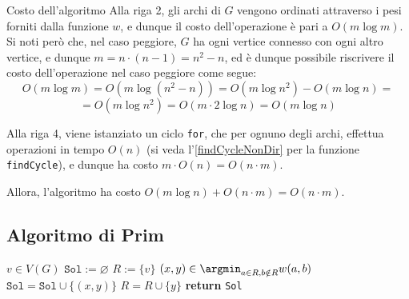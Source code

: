 \documentclass[a4paper, 12pt]{report}
\begin{document}
    \begin{framedobs}{Costo dell'algoritmo}
        Alla riga 2, gli archi di $G$ vengono ordinati attraverso i pesi forniti dalla funzione $w$, e dunque il costo dell'operazione è pari a $O(m \log m)$. Si noti però che, nel caso peggiore, $G$ ha ogni vertice connesso con ogni altro vertice, e dunque $m = n\cdot ( n - 1) = n^2 - n$, ed è dunque possibile riscrivere il costo dell'operazione nel caso peggiore come segue: $$O (m \log m) = O(m \log (n^2 - n)) = O(m \log n^2) - O(m \log n) =$$ $$= O(m \log n^2) = O(m \cdot 2 \log n) = O(m \log n)$$

        Alla riga 4, viene istanziato un ciclo \texttt{for}, che per ognuno degli archi, effettua operazioni in tempo $O(n)$ (si veda l'\cref{findCycleNonDir} per la funzione \texttt{findCycle}), e dunque ha costo $m \cdot O(n) = O(n \cdot m)$.

        Allora, l'algoritmo ha costo $O(m \log n) + O(n \cdot m) = O(n \cdot m)$.
    \end{framedobs}

    \subsection{Algoritmo di Prim}

    \begin{algorithm}[H]
        \caption{
            Dato un grafo indiretto connesso $G$, pesato attraverso $w$ con pesi positivi, l'algoritmo ne restituisce un MST.\\
            \textbf{Input}: $G$ grafo indiretto connesso; $w$ una funzione che associa pesi positivi agli archi in $E(G)$.\\
            \textbf{Output}: un MST di $G$.
        }

        \begin{algorithmic}[1]
                \State $v \in V(G)$
                \State $\texttt{Sol} := \varnothing$
                \State $R := \{v\}$
                    \State $\displaystyle (x, y) \in \argmin_{a \in R, b \notin R} {w(a, b)}$
                    \State $\texttt{Sol} = \texttt{Sol} \cup \{ (x, y) \}$
                    \State $R = R \cup \{y\}$
                \EndWhile
                \State \textbf{return} \texttt{Sol}
            \EndFunction
        \end{algorithmic}
    \end{algorithm}
\end{document}
